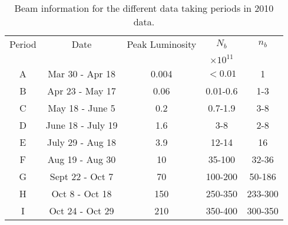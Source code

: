 \begin{table}
\begin{center}
\begin{tabular}{|c|c|c|c|c|}
\hline
Period&Date&Peak Luminosity& $N_b$ & $n_b$ \\
& &\lumi{}& $\times10^{11}$ & \\
\hline
A & Mar 30 - Apr 18 & 0.004 & $<0.01$ & 1 \\
B & Apr 23 - May 17 & 0.06 & 0.01-0.6 & 1-3 \\
C & May 18 - June 5 & 0.2 & 0.7-1.9 & 3-8 \\
D & June 18 - July 19 & 1.6 & 3-8 & 2-8 \\
E & July 29 - Aug 18 & 3.9 & 12-14 & 16 \\
F & Aug 19 - Aug 30 & 10 & 35-100 & 32-36 \\
G & Sept 22 - Oct 7 & 70 & 100-200 & 50-186 \\
H & Oct 8 - Oct 18 & 150 & 250-350 & 233-300 \\
I & Oct 24 - Oct 29 & 210 & 350-400 & 300-350 \\
\hline
\end{tabular}
\caption[2010 Data Period Information]{
   Beam information for the different data taking periods in 2010 data.
\label{Det:Periods}
}
\end{center}
\end{table}

